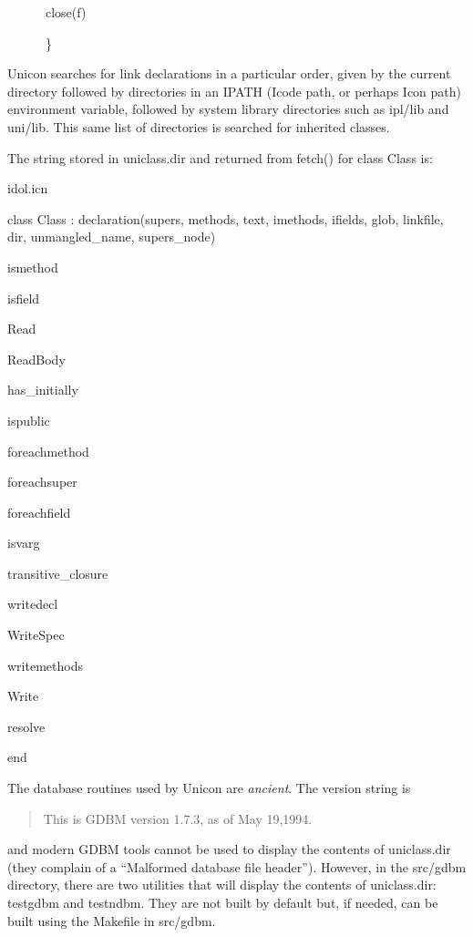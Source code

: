 {\ttfamily\mdseries
\ \ \ \ \ \ close(f)}

{\ttfamily\mdseries
\ \ \ \ \ \ \}}


Unicon searches for {\textquotedbl}link{\textquotedbl} declarations in
a particular order, given by the current directory followed by
directories in an IPATH (Icode path, or perhaps Icon path) environment
variable, followed by system library directories such as ipl/lib and
uni/lib. This same list of directories is searched for inherited
classes.


The string stored in uniclass.dir and returned from fetch() for class Class is: 

{\ttfamily\mdseries
idol.icn}

{\ttfamily\mdseries
class Class : declaration(supers, methods, text, imethods, ifields, glob, linkfile, dir, unmangled\_name, supers\_node)}

{\ttfamily\mdseries
ismethod}

{\ttfamily\mdseries
isfield}

{\ttfamily\mdseries
Read}

{\ttfamily\mdseries
ReadBody}

{\ttfamily\mdseries
has\_initially}

{\ttfamily\mdseries
ispublic}

{\ttfamily\mdseries
foreachmethod}

{\ttfamily\mdseries
foreachsuper}

{\ttfamily\mdseries
foreachfield}

{\ttfamily\mdseries
isvarg}

{\ttfamily\mdseries
transitive\_closure}

{\ttfamily\mdseries
writedecl}

{\ttfamily\mdseries
WriteSpec}

{\ttfamily\mdseries
writemethods}

{\ttfamily\mdseries
Write}

{\ttfamily\mdseries
resolve}

{\ttfamily\mdseries
end}

\goodbreak
The database routines used by Unicon are {\em ancient}.
The version string is
\begin{quote}
{\ttfamily\mdseries This is GDBM version 1.7.3, as of May 19,1994.}
\end{quote}
and modern GDBM tools cannot be used to display the contents of
uniclass.dir (they complain of a ``Malformed database file header'').
However, in the src/gdbm directory, there are two utilities that will
display the contents of uniclass.dir: testgdbm and testndbm. They are
not built by default but, if needed, can be built using the Makefile
in src/gdbm.

